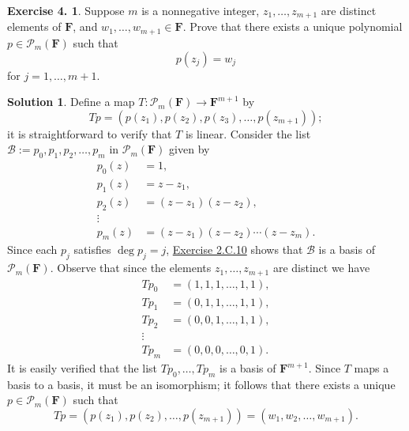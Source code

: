 \documentclass[12pt]{article}
\theoremstyle{definition}
\theoremstyle{exercise}
\newtheorem{exercise}{Exercise 4.}
\theoremstyle{solution}
\newtheorem*{solution}{Solution}
\newcommand{\poly}{\mathcal{P}}
\newcommand{\F}{\mathbf{F}}
\begin{document}
\begin{exercise}
\label{ex:5}
    Suppose \( m \) is a nonnegative integer, \( z_1, \ldots, z_{m+1} \) are distinct elements of \( \F \), and \( w_1, \ldots, w_{m+1} \in \F \). Prove that there exists a unique polynomial \( p \in \poly_m(\F) \) such that
    \[
        p(z_j) = w_j
    \]
    for \( j = 1, \ldots, m+1 \).

\end{exercise}

\begin{solution}
    Define a map \( T : \poly_m(\F) \to \F^{m+1} \) by
    \[
        Tp = (p(z_1), p(z_2), p(z_3), \ldots, p(z_{m+1}));
    \]
    it is straightforward to verify that \( T \) is linear. Consider the list \( \mathscr{B} := p_0, p_1, p_2, \ldots, p_m \) in \( \poly_m(\F) \) given by
    \begin{align*}
        p_0(z) &= 1, \\
        p_1(z) &= z - z_1, \\
        p_2(z) &= (z - z_1)(z - z_2), \\
        \vdots & \\
        p_m(z) &= (z - z_1)(z - z_2) \cdots (z - z_m).
    \end{align*}
    Since each \( p_j \) satisfies \( \deg p_j = j \), \href{https://lew98.github.io/Mathematics/LADR_Section_2_C_Exercises.pdf}{Exercise 2.C.10} shows that \( \mathscr{B} \) is a basis of \( \poly_m(\F) \). Observe that since the elements \( z_1, \ldots, z_{m+1} \) are distinct we have
    \begin{align*}
        Tp_0 &= (1, 1, 1, \ldots, 1, 1), \\
        Tp_1 &= (0, 1, 1, \ldots, 1, 1), \\
        Tp_2 &= (0, 0, 1, \ldots, 1, 1), \\
        \vdots & \\
        Tp_m &= (0, 0, 0, \ldots, 0, 1).
    \end{align*}
    It is easily verified that the list \( Tp_0, \ldots, Tp_m \) is a basis of \( \F^{m+1} \). Since \( T \) maps a basis to a basis, it must be an isomorphism; it follows that there exists a unique \( p \in \poly_m(\F) \) such that
    \[
        Tp = (p(z_1), p(z_2), \ldots, p(z_{m+1})) = (w_1, w_2, \ldots, w_{m+1}).
    \]
\end{solution}
\end{document}
